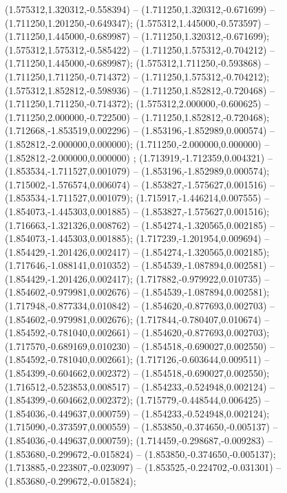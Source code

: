  (1.575312,1.320312,-0.558394) -- (1.711250,1.320312,-0.671699) -- (1.711250,1.201250,-0.649347);
 (1.575312,1.445000,-0.573597) -- (1.711250,1.445000,-0.689987) -- (1.711250,1.320312,-0.671699);
 (1.575312,1.575312,-0.585422) -- (1.711250,1.575312,-0.704212) -- (1.711250,1.445000,-0.689987);
 (1.575312,1.711250,-0.593868) -- (1.711250,1.711250,-0.714372) -- (1.711250,1.575312,-0.704212);
 (1.575312,1.852812,-0.598936) -- (1.711250,1.852812,-0.720468) -- (1.711250,1.711250,-0.714372);
 (1.575312,2.000000,-0.600625) -- (1.711250,2.000000,-0.722500) -- (1.711250,1.852812,-0.720468);
 (1.712668,-1.853519,0.002296) -- (1.853196,-1.852989,0.000574) -- (1.852812,-2.000000,0.000000);
 (1.711250,-2.000000,0.000000) -- (1.852812,-2.000000,0.000000) ;
 (1.713919,-1.712359,0.004321) -- (1.853534,-1.711527,0.001079) -- (1.853196,-1.852989,0.000574);
 (1.715002,-1.576574,0.006074) -- (1.853827,-1.575627,0.001516) -- (1.853534,-1.711527,0.001079);
 (1.715917,-1.446214,0.007555) -- (1.854073,-1.445303,0.001885) -- (1.853827,-1.575627,0.001516);
 (1.716663,-1.321326,0.008762) -- (1.854274,-1.320565,0.002185) -- (1.854073,-1.445303,0.001885);
 (1.717239,-1.201954,0.009694) -- (1.854429,-1.201426,0.002417) -- (1.854274,-1.320565,0.002185);
 (1.717646,-1.088141,0.010352) -- (1.854539,-1.087894,0.002581) -- (1.854429,-1.201426,0.002417);
 (1.717882,-0.979922,0.010735) -- (1.854602,-0.979981,0.002676) -- (1.854539,-1.087894,0.002581);
 (1.717948,-0.877334,0.010842) -- (1.854620,-0.877693,0.002703) -- (1.854602,-0.979981,0.002676);
 (1.717844,-0.780407,0.010674) -- (1.854592,-0.781040,0.002661) -- (1.854620,-0.877693,0.002703);
 (1.717570,-0.689169,0.010230) -- (1.854518,-0.690027,0.002550) -- (1.854592,-0.781040,0.002661);
 (1.717126,-0.603644,0.009511) -- (1.854399,-0.604662,0.002372) -- (1.854518,-0.690027,0.002550);
 (1.716512,-0.523853,0.008517) -- (1.854233,-0.524948,0.002124) -- (1.854399,-0.604662,0.002372);
 (1.715779,-0.448544,0.006425) -- (1.854036,-0.449637,0.000759) -- (1.854233,-0.524948,0.002124);
 (1.715090,-0.373597,0.000559) -- (1.853850,-0.374650,-0.005137) -- (1.854036,-0.449637,0.000759);
 (1.714459,-0.298687,-0.009283) -- (1.853680,-0.299672,-0.015824) -- (1.853850,-0.374650,-0.005137);
 (1.713885,-0.223807,-0.023097) -- (1.853525,-0.224702,-0.031301) -- (1.853680,-0.299672,-0.015824);
